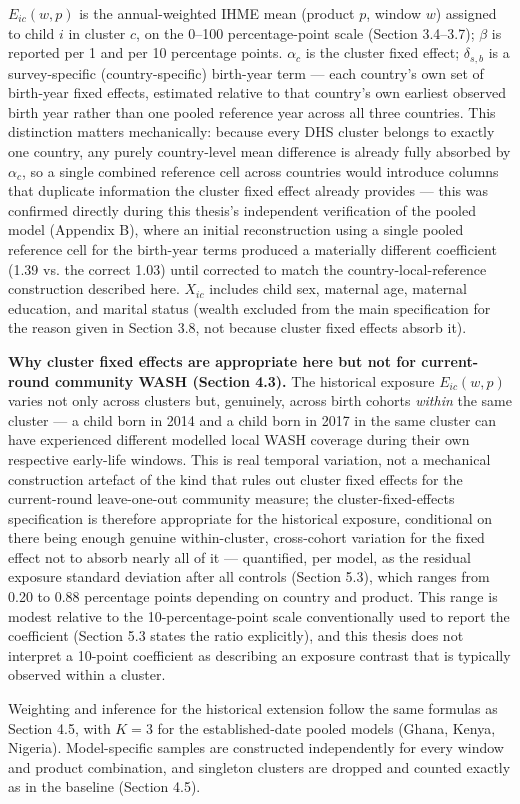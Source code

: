$E_{ic}(w,p)$ is the annual-weighted IHME mean (product $p$, window $w$) assigned to child $i$ in cluster $c$, on the 0--100 percentage-point scale (Section 3.4--3.7); $\beta$ is reported per 1 and per 10 percentage points. $\alpha_c$ is the cluster fixed effect; $\delta_{s,b}$ is a survey-specific (country-specific) birth-year term --- each country's own set of birth-year fixed effects, estimated relative to that country's own earliest observed birth year rather than one pooled reference year across all three countries. This distinction matters mechanically: because every DHS cluster belongs to exactly one country, any purely country-level mean difference is already fully absorbed by $\alpha_c$, so a single combined reference cell across countries would introduce columns that duplicate information the cluster fixed effect already provides --- this was confirmed directly during this thesis's independent verification of the pooled model (Appendix B), where an initial reconstruction using a single pooled reference cell for the birth-year terms produced a materially different coefficient (1.39 vs. the correct 1.03) until corrected to match the country-local-reference construction described here. $X_{ic}$ includes child sex, maternal age, maternal education, and marital status (wealth excluded from the main specification for the reason given in Section 3.8, not because cluster fixed effects absorb it).

\textbf{Why cluster fixed effects are appropriate here but not for current-round community WASH (Section 4.3).} The historical exposure $E_{ic}(w,p)$ varies not only across clusters but, genuinely, across birth cohorts \textit{within} the same cluster --- a child born in 2014 and a child born in 2017 in the same cluster can have experienced different modelled local WASH coverage during their own respective early-life windows. This is real temporal variation, not a mechanical construction artefact of the kind that rules out cluster fixed effects for the current-round leave-one-out community measure; the cluster-fixed-effects specification is therefore appropriate for the historical exposure, conditional on there being enough genuine within-cluster, cross-cohort variation for the fixed effect not to absorb nearly all of it --- quantified, per model, as the residual exposure standard deviation after all controls (Section 5.3), which ranges from 0.20 to 0.88 percentage points depending on country and product. This range is modest relative to the 10-percentage-point scale conventionally used to report the coefficient (Section 5.3 states the ratio explicitly), and this thesis does not interpret a 10-point coefficient as describing an exposure contrast that is typically observed within a cluster.

Weighting and inference for the historical extension follow the same formulas as Section 4.5, with $K=3$ for the established-date pooled models (Ghana, Kenya, Nigeria). Model-specific samples are constructed independently for every window and product combination, and singleton clusters are dropped and counted exactly as in the baseline (Section 4.5).
